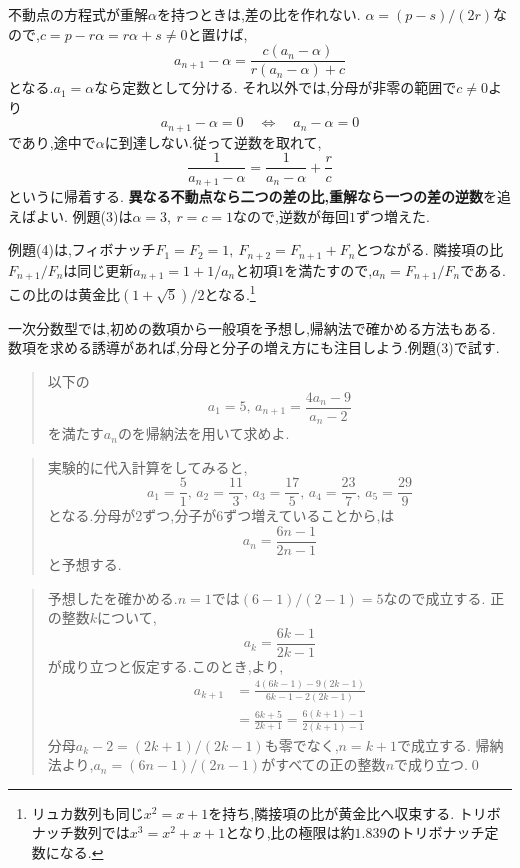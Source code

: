     不動点の方程式が重解$\alpha$を持つときは,差の比を作れない.
    $\alpha=(p-s)/(2r)$なので,$c=p-r\alpha=r\alpha+s\ne0$と置けば,
    \[
      a_{n+1}-\alpha
      =\frac{c(a_n-\alpha)}{r(a_n-\alpha)+c}
    \]
    となる.$a_1=\alpha$なら定数として分ける.
    それ以外では,分母が非零の範囲で$c\ne0$より
    \[
      a_{n+1}-\alpha=0
      \quad\Longleftrightarrow\quad a_n-\alpha=0
    \]
    であり,途中で$\alpha$に到達しない.従って逆数を取れて,
    \[
      \frac1{a_{n+1}-\alpha}
      =\frac1{a_n-\alpha}+\frac rc
    \]
    というに帰着する.
    \textbf{異なる不動点なら二つの差の比,重解なら一つの差の逆数}を追えばよい.
    例題(3)は$\alpha=3,\ r=c=1$なので,逆数が毎回$1$ずつ増えた.

    例題(4)は,フィボナッチ$F_1=F_2=1,\ F_{n+2}=F_{n+1}+F_n$とつながる.
    隣接項の比$F_{n+1}/F_n$は同じ更新$a_{n+1}=1+1/a_n$と初項$1$を満たすので,$a_n=F_{n+1}/F_n$である.
    この比のは黄金比$(1+\sqrt5)/2$となる.\footnote{リュカ数列も同じ$x^2=x+1$を持ち,隣接項の比が黄金比へ収束する.
    トリボナッチ数列では$x^3=x^2+x+1$となり,比の極限は約$1.839$のトリボナッチ定数になる.}

  一次分数型では,初めの数項から一般項を予想し,帰納法で確かめる方法もある.
  数項を求める誘導があれば,分母と分子の増え方にも注目しよう.例題(3)で試す.\\
    \noindent{}\par\nobreak
    \begin{quote}
      以下の
      \[
        a_1=5,\, a_{n+1}=\dfrac{4a_{n}-9}{a_{n}-2}
      \]
      を満たす$a_n$のを帰納法を用いて求めよ.
    \end{quote}
    \begin{quote}
      実験的に代入計算をしてみると,
      \[
        a_1=\frac{5}{1},\,a_2=\frac{11}{3},\,a_3=\frac{17}{5},\,a_4=\frac{23}{7},\,a_5=\frac{29}{9}
      \]
      となる.分母が2ずつ,分子が6ずつ増えていることから,は
      \[
        a_n=\frac{6n-1}{2n-1}
      \]
      と予想する.
    \end{quote}
    \begin{quote}
      予想したを確かめる.$n=1$では$(6-1)/(2-1)=5$なので成立する.
      正の整数$k$について,
      \[
        a_k=\frac{6k-1}{2k-1}
      \]
      が成り立つと仮定する.このとき,より,
      \begin{align*}
        a_{k+1}&=\frac{4(6k-1)-9(2k-1)}{6k-1-2(2k-1)}\\
        &=\frac{6k+5}{2k+1}
          =\frac{6(k+1)-1}{2(k+1)-1}
      \end{align*}
      分母$a_k-2=(2k+1)/(2k-1)$も零でなく,$n=k+1$で成立する.
      帰納法より,$a_n=(6n-1)/(2n-1)$がすべての正の整数$n$で成り立つ.\qed

  \end{quote}
